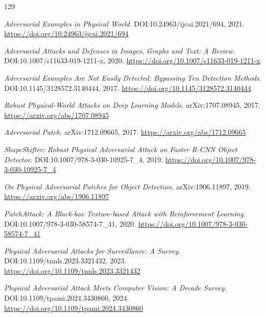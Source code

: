 \documentclass[11pt,a4paper]{article}
\begin{document}
\begin{thebibliography}{129}
\setlength{\itemsep}{2pt}

\newblock \emph{Adversarial Examples in Physical World}.
\newblock DOI:10.24963/ijcai.2021/694, 2021.
\newblock \url{https://doi.org/10.24963/ijcai.2021/694}

\newblock \emph{Adversarial Attacks and Defenses in Images, Graphs and Text: A Review}.
\newblock DOI:10.1007/s11633-019-1211-x, 2020.
\newblock \url{https://doi.org/10.1007/s11633-019-1211-x}

\newblock \emph{Adversarial Examples Are Not Easily Detected: Bypassing Ten Detection Methods}.
\newblock DOI:10.1145/3128572.3140444, 2017.
\newblock \url{https://doi.org/10.1145/3128572.3140444}

\newblock \emph{Robust Physical-World Attacks on Deep Learning Models}.
\newblock arXiv:1707.08945, 2017.
\newblock \url{https://arxiv.org/abs/1707.08945}

\newblock \emph{Adversarial Patch}.
\newblock arXiv:1712.09665, 2017.
\newblock \url{https://arxiv.org/abs/1712.09665}

\newblock \emph{ShapeShifter: Robust Physical Adversarial Attack on Faster R-CNN Object Detector}.
\newblock DOI:10.1007/978-3-030-10925-7\_4, 2019.
\newblock \url{https://doi.org/10.1007/978-3-030-10925-7_4}

\newblock \emph{On Physical Adversarial Patches for Object Detection}.
\newblock arXiv:1906.11897, 2019.
\newblock \url{https://arxiv.org/abs/1906.11897}

\newblock \emph{PatchAttack: A Black-box Texture-based Attack with Reinforcement Learning}.
\newblock DOI:10.1007/978-3-030-58574-7\_41, 2020.
\newblock \url{https://doi.org/10.1007/978-3-030-58574-7_41}

\newblock \emph{Physical Adversarial Attacks for Surveillance: A Survey}.
\newblock DOI:10.1109/tnnls.2023.3321432, 2023.
\newblock \url{https://doi.org/10.1109/tnnls.2023.3321432}

\newblock \emph{Physical Adversarial Attack Meets Computer Vision: A Decade Survey}.
\newblock DOI:10.1109/tpami.2024.3430860, 2024.
\newblock \url{https://doi.org/10.1109/tpami.2024.3430860}


\end{thebibliography}
\end{document}
